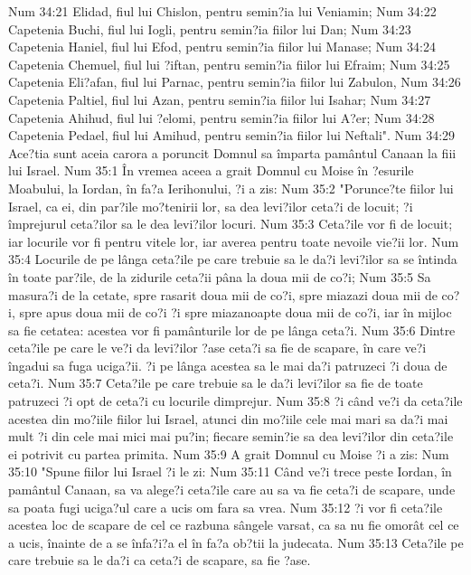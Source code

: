Num 34:21  Elidad, fiul lui Chislon, pentru semin?ia lui Veniamin;
Num 34:22  Capetenia Buchi, fiul lui Iogli, pentru semin?ia fiilor lui Dan;
Num 34:23  Capetenia Haniel, fiul lui Efod, pentru semin?ia fiilor lui Manase;
Num 34:24  Capetenia Chemuel, fiul lui ?iftan, pentru semin?ia fiilor lui Efraim;
Num 34:25  Capetenia Eli?afan, fiul lui Parnac, pentru semin?ia fiilor lui Zabulon,
Num 34:26  Capetenia Paltiel, fiul lui Azan, pentru semin?ia fiilor lui Isahar;
Num 34:27  Capetenia Ahihud, fiul lui ?elomi, pentru semin?ia fiilor lui A?er;
Num 34:28  Capetenia Pedael, fiul lui Amihud, pentru semin?ia fiilor lui Neftali".
Num 34:29  Ace?tia sunt aceia carora a poruncit Domnul sa împarta pamântul Canaan la fiii lui Israel.
Num 35:1  În vremea aceea a grait Domnul cu Moise în ?esurile Moabului, la Iordan, în fa?a Ierihonului, ?i a zis:
Num 35:2  "Porunce?te fiilor lui Israel, ca ei, din par?ile mo?tenirii lor, sa dea levi?ilor ceta?i de locuit; ?i împrejurul ceta?ilor sa le dea levi?ilor locuri.
Num 35:3  Ceta?ile vor fi de locuit; iar locurile vor fi pentru vitele lor, iar averea pentru toate nevoile vie?ii lor.
Num 35:4  Locurile de pe lânga ceta?ile pe care trebuie sa le da?i levi?ilor sa se întinda în toate par?ile, de la zidurile ceta?ii pâna la doua mii de co?i;
Num 35:5  Sa masura?i de la cetate, spre rasarit doua mii de co?i, spre miazazi doua mii de co?i, spre apus doua mii de co?i ?i spre miazanoapte doua mii de co?i, iar în mijloc sa fie cetatea: acestea vor fi pamânturile lor de pe lânga ceta?i.
Num 35:6  Dintre ceta?ile pe care le ve?i da levi?ilor ?ase ceta?i sa fie de scapare, în care ve?i îngadui sa fuga uciga?ii. ?i pe lânga acestea sa le mai da?i patruzeci ?i doua de ceta?i.
Num 35:7  Ceta?ile pe care trebuie sa le da?i levi?ilor sa fie de toate patruzeci ?i opt de ceta?i cu locurile dimprejur.
Num 35:8  ?i când ve?i da ceta?ile acestea din mo?iile fiilor lui Israel, atunci din mo?iile cele mai mari sa da?i mai mult ?i din cele mai mici mai pu?in; fiecare semin?ie sa dea levi?ilor din ceta?ile ei potrivit cu partea primita.
Num 35:9  A grait Domnul cu Moise ?i a zis:
Num 35:10  "Spune fiilor lui Israel ?i le zi:
Num 35:11  Când ve?i trece peste Iordan, în pamântul Canaan, sa va alege?i ceta?ile care au sa va fie ceta?i de scapare, unde sa poata fugi uciga?ul care a ucis om fara sa vrea.
Num 35:12  ?i vor fi ceta?ile acestea loc de scapare de cel ce razbuna sângele varsat, ca sa nu fie omorât cel ce a ucis, înainte de a se înfa?i?a el în fa?a ob?tii la judecata.
Num 35:13  Ceta?ile pe care trebuie sa le da?i ca ceta?i de scapare, sa fie ?ase.
